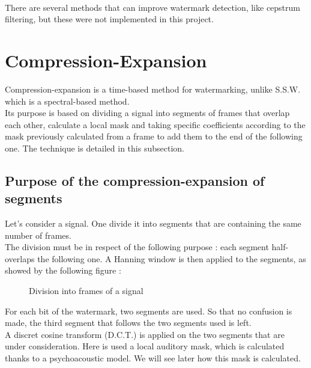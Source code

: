 ~

There are several methods that can improve watermark detection, like cepstrum filtering, but these were not implemented in this project.

\section{Compression-Expansion}\cite{foo2010}

Compression-expansion is a time-based method for watermarking, unlike S.S.W. which is a spectral-based method.\\
Its purpose is based on dividing a signal into segments of frames that overlap each other, calculate a local mask and taking specific coefficients according to the mask previously calculated from a frame to add them to the end of the following one. The technique is detailed in this subsection.

\subsection{Purpose of the compression-expansion of segments}
Let's consider a signal. One divide it into segments that are containing the same number of frames.\\
The division must be in respect of the following purpose : each segment half-overlaps the following one. A Hanning window is then applied to the segments, as showed by the following figure :
\begin{figure}[H]
\caption{\label{frames} Division into frames of a signal}
\end{figure}
For each bit of the watermark, two segments are used. So that no confusion is made, the third segment that follows the two segments used is left.\\
A discret cosine transform (D.C.T.) is applied on the two segments that are under consideration. Here is used a local auditory mask, which is calculated thanks to a psychoacoustic model. We will see later how this mask is calculated.

